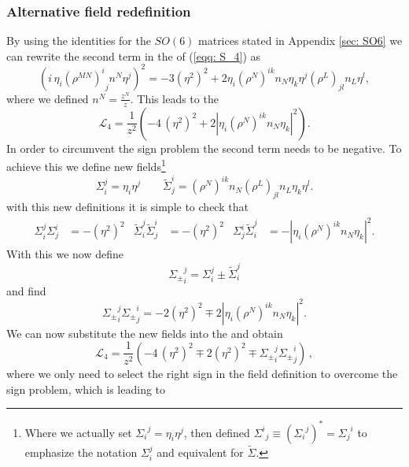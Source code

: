 \subsubsection{Alternative field redefinition}
By using the identities for the $SO(6)$ matrices stated in Appendix \ref{sec: SO6} we can rewrite the second term in the  of (\ref{eqq: S_4}) as
%
%
\begin{equation}
\left(i\, \eta_i {(\rho^{MN})^i}_j n^N \eta^j\right)^2=-3 (\eta^2)^2+2\eta_i (\rho^N)^{ik} n_N \eta_k \eta^j (\rho^L)_{jl} n_L \eta^l,
\end{equation}
%
%
where we defined $n^{N}=\tfrac{z^{N}}{z}$. This leads to the 
%
%
\begin{equation}
\mathcal{L}_4=\frac{1}{z^2}\left(- 4\, (\eta^2)^2+2\left|\eta_i (\rho^N)^{ik} n_N \eta_k\right|^2\right).
\end{equation}
%
%
In order to circumvent the sign problem the second term needs to be negative. To achieve this we define new fields\footnote{Where we actually set ${\Sigma_i}^j=\eta_i \eta^j$, then defined ${\Sigma^{i}}_{j}\equiv({\Sigma_i}^{j})^{*}={\Sigma_{j}}^{i}$ to emphasize the notation $\Sigma_i^j$ and equivalent for $\tilde{\Sigma}$.}
%
%
\begin{equation}
\Sigma_i^j=\eta_i \eta^j \qquad \tilde{\Sigma}_j^i=(\rho^N)^{ik}n_N (\rho^L)_{jl}n_L \eta_k \eta^l.
\end{equation}
%
%
with this new definitions it is simple to check that
%
%
\begin{align}
 \Sigma^j_{i}\Sigma^i_j&=-(\eta^2)^2 & \tilde\Sigma^j_{i} \tilde\Sigma^i_j&=-(\eta^2)^2 & \Sigma^i_j \tilde\Sigma^j_i&=-\left|\eta_i (\rho^N)^{ik} n_N \eta_k\right|^2.
\end{align}
%
%
With this we now define
%
%
\begin{equation}
{\Sigma_{\pm}}_i^j=\Sigma_i^j\pm \tilde \Sigma_i^j
\end{equation}
%
%
and find
%
%
\begin{equation}
 {\Sigma_{\pm}}_i^j{\Sigma_{\pm}}_j^i=-2(\eta^2)^2 \mp 2\left|\eta_i (\rho^N)^{ik} n_N \eta_k\right|^2.
\end{equation}
%
%
We can now substitute the new fields into the  and obtain
%
%
\begin{equation}
\mathcal{L}_4=\frac{1}{z^2}\left(- 4\, (\eta^2)^2 \mp 2(\eta^2)^2 \mp {\Sigma_{\pm}}_i^j{\Sigma_{\pm}}_j^i \right)\,,
\end{equation}
%
%
where we only need to select the right sign in the field definition to overcome the sign problem, which is leading to
